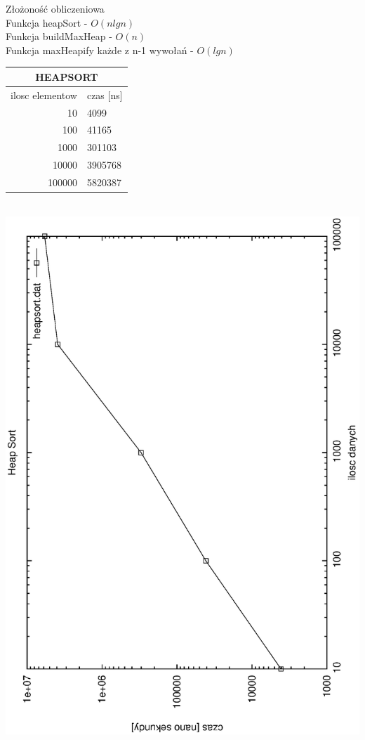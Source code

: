 \documentclass[a4paper,11pt]{report}
\begin{document}
Złożoność obliczeniowa\\
Funkcja heapSort - $O(nlgn)$\\  
Funkcja buildMaxHeap - $O(n)$\\
Funkcja maxHeapify każde z n-1 wywołań - $O(lgn)$\\
\begin{tabular}{|rl|}
\hline
\multicolumn{2}{|c|}{HEAPSORT}\\
\hline
ilosc elementow & czas [ns]\\
\hline
10&4099\\
100&41165\\
1000&301103\\
10000&3905768\\
100000&5820387\\
\hline
\end{tabular}
\\
\includegraphics[angle=270, scale = 0.5]{wykresy/heapsort.eps}
\newpage
\end{document}
